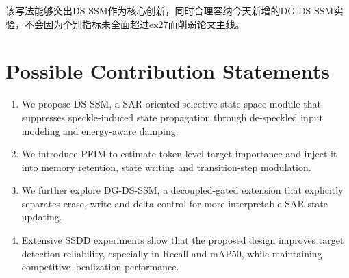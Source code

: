\documentclass[UTF8,zihao=-4]{ctexart}
\begin{document}
该写法能够突出DS-SSM作为核心创新，同时合理容纳今天新增的DG-DS-SSM实验，不会因为个别指标未全面超过ex27而削弱论文主线。

\section{Possible Contribution Statements}

\begin{enumerate}
  \item We propose DS-SSM, a SAR-oriented selective state-space module that suppresses speckle-induced state propagation through de-speckled input modeling and energy-aware damping.
  \item We introduce PFIM to estimate token-level target importance and inject it into memory retention, state writing and transition-step modulation.
  \item We further explore DG-DS-SSM, a decoupled-gated extension that explicitly separates erase, write and delta control for more interpretable SAR state updating.
  \item Extensive SSDD experiments show that the proposed design improves target detection reliability, especially in Recall and mAP50, while maintaining competitive localization performance.
\end{enumerate}
\end{document}
